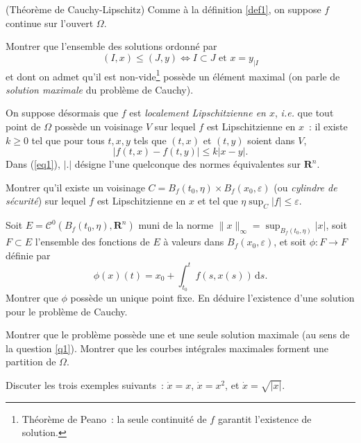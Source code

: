 \documentclass[11pt,a4paper]{article}
\def\R{\mathbf{R}}
\def\Cc{\mathscr{C}}
\def\iy{\infty}
\def\veps{\varepsilon}
\def\ie{\emph{i.e.}}
\theoremstyle{plain}
\theoremstyle{definition}
\begin{document}
\begin{Exercice} (Th\'eor\`eme de Cauchy-Lipschitz) Comme \`a la
d\'efinition \ref{def1}, on suppose $f$ continue sur l'ouvert $\Omega$.

\begin{Question} \label{q1}
Montrer que l'ensemble des solutions ordonn\'e par
$$ (I,x) \leq (J,y) \iff I \subset J \text{ et } x=y_{|I} $$
et dont on admet qu'il est non-vide\footnote{Th\'eor\`eme de Peano~: la
seule continuit\'e de $f$ garantit l'existence de solution.}
poss\`ede un \'el\'ement maximal (on parle de \emph{solution maximale} du
probl\`eme de Cauchy).
\end{Question}

On suppose d\'esormais que $f$ est
\emph{localement Lipschitzienne en $x$}, \ie{}
que tout point de $\Omega$ poss\`ede un voisinage $V$ sur lequel $f$ est
Lipschitzienne en $x$~: il existe $k \geq 0$ tel que pour tous $t,x,y$ tels
que $(t,x)$ et $(t,y)$ soient dans $V$,
\begin{equation} \label{eq1}
  |f(t,x)-f(t,y)| \leq k|x-y|.
\end{equation}
Dans (\ref{eq1}), $|.|$ d\'esigne l'une quelconque des normes
\'equivalentes sur $\R^n$.

\begin{Question} Montrer qu'il existe un voisinage $C=B_f(t_0,\eta) \times
B_f(x_0,\veps)$ (ou \emph{cylindre de s\'ecurit\'e}) sur lequel $f$ est
Lipschitzienne en $x$ et tel que $\eta \sup_C |f| \leq \veps$.
\end{Question}

\begin{Question} Soit $E=\Cc^0(B_f(t_0,\eta),\R^n)$ muni de la norme
$\|x\|_\iy = \sup_{B_f(t_0,\eta)} |x|$,
soit $F \subset E$ l'ensemble des fonctions de $E$ \`a valeurs dans $B_f(x_0,\veps)$,
et soit $\phi : F \to F$ d\'efinie par
$$ \phi(x)(t) = x_0 + \int_{t_0}^t f(s,x(s))\,\mathrm{d}s. $$
Montrer que $\phi$ poss\`ede un unique point fixe. En d\'eduire
l'existence d'une solution pour le probl\`eme de Cauchy.
\end{Question}

\begin{Question} Montrer que le probl\`eme poss\`ede une et une seule
solution maximale (au sens de la question \ref{q1}). Montrer que les
courbes int\'egrales maximales forment une partition de $\Omega$.
\end{Question}

\begin{Question} Discuter les trois exemples suivants~: $\dot{x}=x$,
$\dot{x}=x^2$, et $\dot{x}=\sqrt{|x|}$.
\end{Question}
\end{Exercice} \vspace*{1em}
\end{document}
